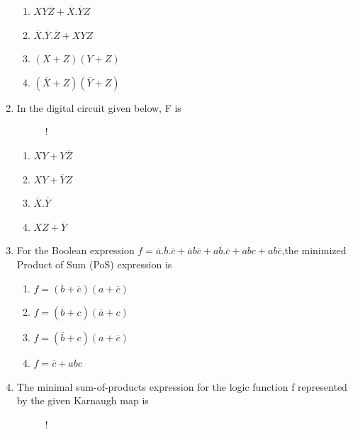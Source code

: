 \documentclass[journal,12pt,twocolumn]{IEEEtran}
\begin{document}
\begin{enumerate}
    \begin{enumerate}
      \item $XY\overline{Z}+\overline{X}.\overline{Y}Z$ 
      \item $\overline{X}.\overline{Y}.\overline{Z}+XYZ$
      \item $(X+Z)(Y+Z)$
      \item $(\overline{X}+Z)(\overline{Y}+Z)$
    \end{enumerate}
    \item In the digital circuit given below, F is
\begin{figure}[!h]
\centering
\resizebox {\columnwidth} {!} {

}
\caption{}
\end{figure} 
                        \begin{enumerate}
      \item $XY+Y\overline{Z}$ 
      \item $XY+\overline{Y}Z$
      \item $\overline{X}.\overline{Y}$
      \item $XZ+\overline{Y}$
    \end{enumerate}
    \item For the Boolean expression $f=\overline{a}.\overline{b}.\overline{c}+\overline{a}b\overline{c}+a\overline{b}.\overline{c}+abc+ab\overline{c}$,the minimized Product of Sum (PoS) expression is 
    \begin{enumerate}
      \item $f=(b+\overline{c})(a+\overline{c})$ 
      \item $f=(\overline{b}+c)(\overline{a}+c)$
      \item $f=(\overline{b}+c)(a+\overline{c})$
      \item $f=\overline{c}+abc$
     \end{enumerate}
     \item The minimal sum-of-products expression for the logic function f represented
by the given Karnaugh map is
\begin{figure}[!h]
\centering
\resizebox {\columnwidth} {!} {

}
\caption{}
\end{figure}

\end{enumerate}
\end{document}

